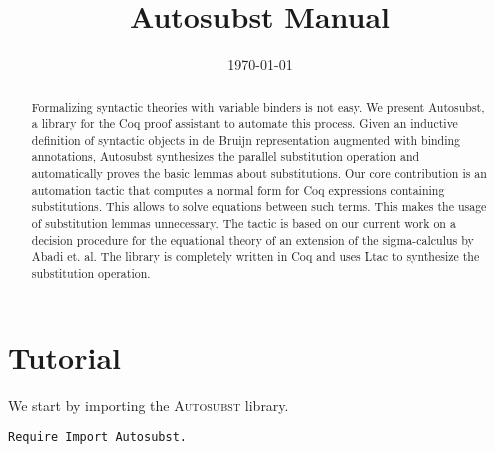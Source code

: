 \documentclass{scrartcl}
\newcommand{\Autosubst}{\textsc{Autosubst}\xspace}
\begin{document}
\title{Autosubst Manual}
\date{\today}
\maketitle

\begin{abstract}
  Formalizing syntactic theories with variable binders is not easy. We present Autosubst, a library for the Coq proof assistant to automate this process. Given an inductive definition of syntactic objects in de Bruijn representation augmented with binding annotations, Autosubst synthesizes the parallel substitution operation and automatically proves the basic lemmas about substitutions. Our core contribution is an automation tactic that computes a normal form for Coq expressions containing substitutions. This allows to solve equations between such terms. This makes the usage of substitution lemmas unnecessary. The tactic is based on our current work on a decision procedure for the equational theory of an extension of the sigma-calculus by Abadi et. al. The library is completely written in Coq and uses Ltac to synthesize the substitution operation.
\end{abstract}

\section{Tutorial}
\label{sec:Tutorial}

We start by importing the \Autosubst library.
\begin{lstlisting}
Require Import Autosubst.
\end{lstlisting}
\end{document}
